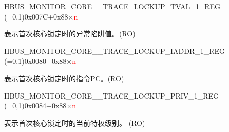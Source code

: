 \begin{register}{H}{BUS\_MONITOR\_CORE\_\_TRACE\_LOCKUP\_TVAL\_1\_REG (=0,1)}{0x007C+0x88×\textcolor{red}{n}}\label{regdesc:BUSMONITORCORE0TRACELOCKUPTVAL1REG}
%
\regnewline%
\begin{regdesc}\begin{reglist}
\label{fielddesc:BUSMONITORCORE0TRACELOCKUPRECORDINGTVAL1}\item [BUS\_MONITOR\_CORE\_\regindex{n}\_TRACE\_LOCKUP\_RECORDING\_TVAL\_1] 表示首次核心锁定时的异常陷阱值。(RO)
\end{reglist}\end{regdesc}
\end{register}


\begin{register}{H}{BUS\_MONITOR\_CORE\_\_TRACE\_LOCKUP\_IADDR\_1\_REG (=0,1)}{0x0080+0x88×\textcolor{red}{n}}\label{regdesc:BUSMONITORCORE0TRACELOCKUPIADDR1REG}
%
\regnewline%
\begin{regdesc}\begin{reglist}
\label{fielddesc:BUSMONITORCORE0TRACELOCKUPRECORDINGIADDR1}\item [BUS\_MONITOR\_CORE\_\regindex{n}\_TRACE\_LOCKUP\_RECORDING\_IADDR\_1] 表示首次核心锁定时的指令PC。(RO)
\end{reglist}\end{regdesc}
\end{register}


\begin{register}{H}{BUS\_MONITOR\_CORE\_\_TRACE\_LOCKUP\_PRIV\_1\_REG (=0,1)}{0x0084+0x88×\textcolor{red}{n}}\label{regdesc:BUSMONITORCORE0TRACELOCKUPPRIV1REG}
%
%
\regnewline%
\begin{regdesc}\begin{reglist}
\label{fielddesc:BUSMONITORCORE0TRACELOCKUPRECORDINGPRIV1}\item [BUS\_MONITOR\_CORE\_\regindex{n}\_TRACE\_LOCKUP\_RECORDING\_PRIV\_1] 表示首次核心锁定时的当前特权级别。 (RO)
\end{reglist}\end{regdesc}
\end{register}


